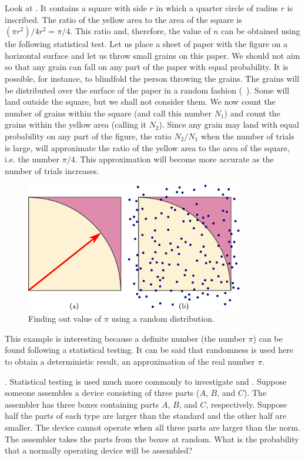  Look at . It contains a square with side $r$ in which a quarter circle of radius $r$ is inscribed. The ratio of the yellow area to the area of the square is $(\pi r^{2})/4r^{2} = \pi /4$. This ratio and, therefore, the value of $n$ can be obtained using the following statistical test. Let us place a sheet of paper with the figure on a horizontal surface and let us throw small grains on this paper. We should not aim so that any grain
can fall on any part of the paper with equal probability. It is possible,
for instance, to blindfold the person throwing the grains. The grains will
be distributed over the surface of the paper in a random fashion
(~). Some will land outside the square, but we shall not consider them. We now count the number of grains within the square (and call
this number $N_{1}$) and count the grains within the yellow area (calling it
$N_{2}$). Since any grain may land with equal probability on any part of the
figure, the ratio $N_{2}/N_{1}$ when the number of trials is large, will
approximate the ratio of the yellow area to the area of the square, i.e.
the number $\pi /4$. This approximation will become more accurate as the
number of trials increases.
 \begin{figure}[!h]
 \centering
 \includegraphics[width=0.85\textwidth]{figures/monte-carlo1.pdf}
\caption{Finding out value of $\pi$ using a random distribution.\label{monte-carlo1}}
 \end{figure}
This example is interesting because a definite number (the number $\pi$)
can be found following a statistical testing. It can be said that
randomness is used here to obtain a deterministic result, an
approximation of the real number $\pi$.


. Statistical testing is used much more commonly to
investigate  and . Suppose someone
assembles a device consisting of three parts ($A$, $B$, and $C$). The assembler
has three boxes containing parts $A$, $B$, and $C$, respectively. Suppose half
the parts of each type are larger than the standard and the other half
are smaller. The device cannot operate when all three parts are larger
than the norm. The assembler takes the parts from the boxes at random.
What is the probability that a normally operating device will be
assembled?

